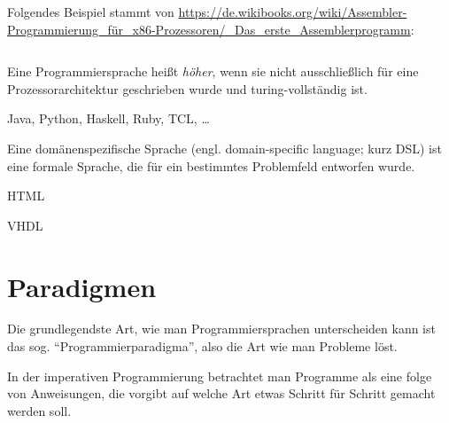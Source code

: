\begin{beispiel}[Assembler]%
    Folgendes Beispiel stammt von \url{https://de.wikibooks.org/wiki/Assembler-Programmierung_für_x86-Prozessoren/_Das_erste_Assemblerprogramm}:
    \inputminted[linenos, numbersep=5pt, tabsize=4, frame=lines, label=firstp.asm]{nasm}{scripts/assembler/firstp.asm}
\end{beispiel}

\begin{definition}%
    Eine Programmiersprache heißt \textit{höher}, wenn sie nicht ausschließlich
    für eine Prozessorarchitektur geschrieben wurde und turing-vollständig ist.
\end{definition}

\begin{beispiel}
    Java, Python, Haskell, Ruby, TCL, \dots
\end{beispiel}

\begin{definition}%
    Eine domänenspezifische Sprache (engl. domain-specific language; kurz DSL) 
    ist eine formale Sprache, die für ein bestimmtes Problemfeld 
    entworfen wurde.
\end{definition}

\begin{beispiel}
    \begin{bspenum}
        \item HTML
        \item VHDL
    \end{bspenum}
\end{beispiel}

\section{Paradigmen}
Die grundlegendste Art, wie man Programmiersprachen unterscheiden
kann ist das sog. \enquote{Programmierparadigma}, also die Art wie
man Probleme löst.

\begin{definition}
    In der imperativen Programmierung betrachtet man Programme als
    eine folge von Anweisungen, die vorgibt auf welche Art etwas 
    Schritt für Schritt gemacht werden soll.
\end{definition}

